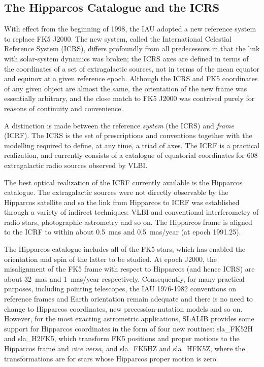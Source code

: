 \documentclass[11pt,twoside,nolof]{starlink}
\begin{document}
\subsection{The Hipparcos Catalogue and the ICRS}
With effect from the beginning of 1998, the IAU adopted a new
reference system to replace FK5 J2000.  The new system, called the
International Celestial Reference System (ICRS), differs profoundly
from all predecessors in that the link with solar-system dynamics
was broken;  the ICRS axes are defined in terms of the coordinates
of a set of extragalactic sources, not in terms of the mean equator and
equinox at a given reference epoch.  Although the ICRS and FK5 coordinates
of any given object are almost the same, the orientation of the new frame
was essentially arbitrary, and the close match to FK5 J2000 was contrived
purely for reasons of continuity and convenience.

A distinction is made between the reference \textit{system}\/ (the ICRS)
and \textit{frame}\/ (ICRF).  The ICRS is the set of prescriptions and
conventions together with the modelling required to define, at any
time, a triad of axes.  The ICRF is a practical realization, and
currently consists of a catalogue of equatorial coordinates for 608
extragalactic radio sources observed by VLBI.

The best optical realization of the ICRF currently available is the
Hipparcos catalogue.  The extragalactic sources were not directly
observable by the Hipparcos satellite and so the link from Hipparcos
to ICRF was established through a variety of indirect techniques: VLBI and
conventional interferometry of radio stars, photographic astrometry
and so on.  The Hipparcos frame is aligned to the ICRF to within about
0.5~mas and 0.5~mas/year (at epoch 1991.25).

The Hipparcos catalogue includes all of the FK5 stars, which has enabled
the orientation and spin of the latter to be studied.  At epoch J2000,
the misalignment of the FK5 frame with respect to Hipparcos
(and hence ICRS) are about 32~mas and 1~mas/year respectively.
Consequently, for many practical purposes, including pointing
telescopes, the IAU 1976-1982 conventions on reference frames and
Earth orientation remain adequate and there is no need to change to
Hipparcos coordinates, new precession-nutation models and so on.
However, for the most exacting astrometric applications, SLALIB
provides some support for Hipparcos coordinates in the form of
four new routines:
sla\_FK52H and
sla\_H2FK5,
which transform FK5 positions and proper motions to the Hipparcos frame
and \textit{vice versa,}\/ and
sla\_FK5HZ and
sla\_HFK5Z,
where the transformations are for stars whose Hipparcos proper motion is
zero.
\end{document}
